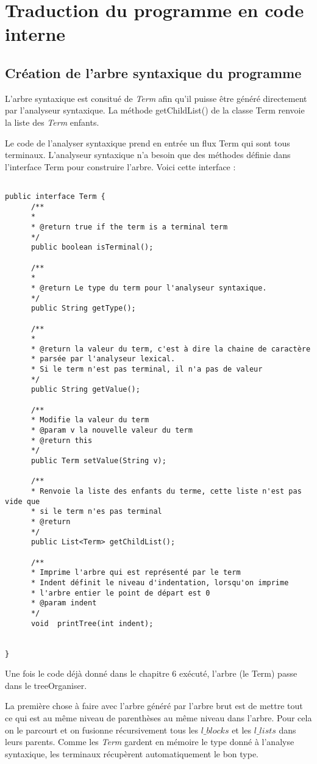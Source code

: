 \section{Traduction du programme en code interne}
\subsection{Création de l'arbre syntaxique du programme}
L'arbre syntaxique est consitué de \emph{Term} afin
qu'il puisse être généré directement par l'analyseur syntaxique. 
La méthode getChildList() de la classe Term renvoie la liste des \emph{Term} enfants.


Le code de l'analyser syntaxique prend en entrée un flux Term qui sont tous terminaux. 
L'analyseur syntaxique n'a besoin que des méthodes définie dans l'interface Term pour construire l'arbre.
Voici cette interface : 
{\tiny
\begin{verbatim}

public interface Term {
	  /**
	  * 
	  * @return true if the term is a terminal term
	  */
	  public boolean isTerminal();
	  
	  /**
	  * 
	  * @return Le type du term pour l'analyseur syntaxique.
	  */
	  public String getType();
	
	  /**
	  * 
	  * @return la valeur du term, c'est à dire la chaine de caractère
	  * parsée par l'analyseur lexical.
	  * Si le term n'est pas terminal, il n'a pas de valeur
	  */
	  public String getValue();
	
	  /**
	  * Modifie la valeur du term
	  * @param v la nouvelle valeur du term
	  * @return this
	  */
	  public Term setValue(String v);
	
	  /**
	  * Renvoie la liste des enfants du terme, cette liste n'est pas vide que
	  * si le term n'es pas terminal
	  * @return
	  */
	  public List<Term> getChildList();
	
	  /**
	  * Imprime l'arbre qui est représenté par le term
	  * Indent définit le niveau d'indentation, lorsqu'on imprime
	  * l'arbre entier le point de départ est 0
	  * @param indent
	  */
	  void	printTree(int indent);
	
	
}
\end{verbatim}}


Une fois le code déjà donné dans le chapitre 6 exécuté, l'arbre (le Term) passe dans le treeOrganiser.

La première chose à faire avec l'arbre généré par l'arbre brut est
de mettre tout ce qui est au même niveau de parenthèses au même niveau
dans l'arbre. Pour cela on le parcourt et on fusionne récursivement tous
les $l\_blocks$ et les $l\_lists$ dans leurs parents. Comme les \emph{Term}
gardent en mémoire le type donné à l'analyse syntaxique, les terminaux
récupèrent automatiquement le bon type. 
 
